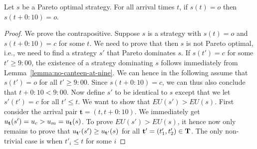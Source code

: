 \begin{lemma}\label{lemma:no-c-after-o}
Let $s$ be a Pareto optimal strategy. For all arrival times $t$, if $s(t) = o$ then $s(t+0{:}10) = o$.
\end{lemma}
\begin{proof}
We prove the contrapositive.
Suppose $s$ is a strategy with $s(t) = o$ and $s(t+0{:}10) = c$ for some $t$. We need to prove that then $s$ is not Pareto optimal, i.e., we need to find a strategy $s'$ that  Pareto dominates $s$. %
If $s(t') = c$ for some $t' \geq 9{:}00$, the existence of a strategy dominating $s$ follows
immediately from Lemma~\ref{lemma:no-canteen-at-nine}. We can hence in the following assume that $s(t') = o$ for all $t' \geq 9{:}00$.  Since $s(t+0{:}10) = c$, we can thus also conclude that $t + 0{:}10 < 9{:}00$.
Now define $s'$ to be identical to $s$ except that we let $s'(t') = c$ for all $t' \leq t$.
We want to show that $EU(s') > EU(s)$. First consider the arrival pair $\mathbf{t} = (t,t+0{:}10)$. We immediately get $u_{\bf t}(s') = u_c > u_m = u_{\bf t}(s)$.
To prove $EU(s') > EU(s)$, it hence now only remains to prove that $u_{\bf t'}(s') \geq u_{\bf t'}(s)$ for all $\mathbf{t'} = (t'_1,t'_2) \in \bf T$. The only non-trivial case is when $t'_i \leq t$ for some $i$ 

\end{proof}
